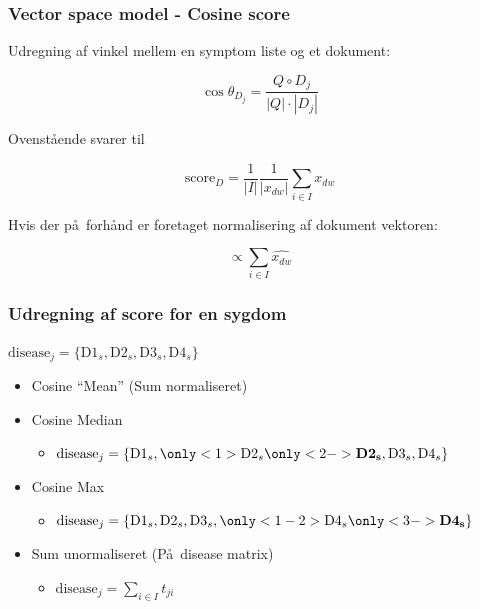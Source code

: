 \documentclass[xcolor=table]{beamer}
\begin{document}
\begin{frame}

  \frametitle{Vector space model - Cosine score}

  Udregning af vinkel mellem en symptom liste og et dokument:
  
  \[
  \cos \theta_{D_j} = \frac{Q \circ D_j}{|Q| \cdot |D_j|}
  \]
  
  Ovenst\aa ende svarer til
  
  \[
  \textrm{score}_{D} = \frac{1}{|I|}\frac{1}{|x_{dw}|} \sum_{i \in I} x_{dw}
  \]
  
  Hvis der p\aa\ forh\aa nd er foretaget normalisering af dokument vektoren:
  
  \[
  \propto  \sum_{i \in I} \widehat{x_{dw}}
  \]
  
\end{frame}

\begin{frame}

  \frametitle{Udregning af score for en sygdom}
  
  $\textrm{disease}_j = \{\textrm{D1}_{s}, \textrm{D2}_{s},
  \textrm{D3}_{s}, \textrm{D4}_{s} \}$

  \begin{itemize}
    \item Cosine ``Mean'' (Sum normaliseret)
      \begin{itemize}
      \end{itemize}
    \item Cosine Median
      \begin{itemize}
        \item $ \textrm{disease}_j =
        \{\textrm{D1}_{s}, \only<1>{\textrm{D2}_{s}}
        \only<2->{\textbf{D2}_{\mathbf{s}}}, \textrm{D3}_{s},
        \textrm{D4}_{s} \}$
      \end{itemize}
    \item Cosine Max
      \begin{itemize}
        \item $ \textrm{disease}_j =
        \{\textrm{D1}_{s}, \textrm{D2}_{s},
        \textrm{D3}_{s}, \only<1-2>{\textrm{D4}_{s}}
        \only<3->{\textbf{D4}_{\mathbf{s}}} \}$
      \end{itemize}
    \item Sum unormaliseret (P\aa\ disease matrix)
      \begin{itemize}
        \item $\textrm{disease}_j = \sum_{i \in I} t_{ji}$
      \end{itemize}
  \end{itemize}

\end{frame}
\end{document}
